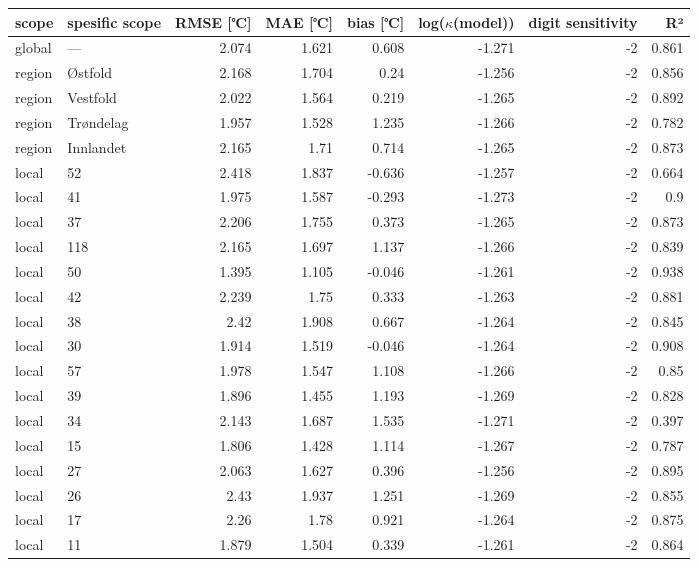 \begin{tabular}{llrrrrrr}
\hline
 scope   & spesific
scope           &       RMSE
[℃] &   MAE [℃] &        bias
[℃] &   log($\kappa$(model)) &    digit
sensitivity &    R² \\
\hline
 global  & ---       & 2.074 &     1.621 &  0.608 &                 -1.271 & -2 & 0.861 \\
 region  & Østfold   & 2.168 &     1.704 &  0.24  &                 -1.256 & -2 & 0.856 \\
 region  & Vestfold  & 2.022 &     1.564 &  0.219 &                 -1.265 & -2 & 0.892 \\
 region  & Trøndelag & 1.957 &     1.528 &  1.235 &                 -1.266 & -2 & 0.782 \\
 region  & Innlandet & 2.165 &     1.71  &  0.714 &                 -1.265 & -2 & 0.873 \\
 local   & 52        & 2.418 &     1.837 & -0.636 &                 -1.257 & -2 & 0.664 \\
 local   & 41        & 1.975 &     1.587 & -0.293 &                 -1.273 & -2 & 0.9   \\
 local   & 37        & 2.206 &     1.755 &  0.373 &                 -1.265 & -2 & 0.873 \\
 local   & 118       & 2.165 &     1.697 &  1.137 &                 -1.266 & -2 & 0.839 \\
 local   & 50        & 1.395 &     1.105 & -0.046 &                 -1.261 & -2 & 0.938 \\
 local   & 42        & 2.239 &     1.75  &  0.333 &                 -1.263 & -2 & 0.881 \\
 local   & 38        & 2.42  &     1.908 &  0.667 &                 -1.264 & -2 & 0.845 \\
 local   & 30        & 1.914 &     1.519 & -0.046 &                 -1.264 & -2 & 0.908 \\
 local   & 57        & 1.978 &     1.547 &  1.108 &                 -1.266 & -2 & 0.85  \\
 local   & 39        & 1.896 &     1.455 &  1.193 &                 -1.269 & -2 & 0.828 \\
 local   & 34        & 2.143 &     1.687 &  1.535 &                 -1.271 & -2 & 0.397 \\
 local   & 15        & 1.806 &     1.428 &  1.114 &                 -1.267 & -2 & 0.787 \\
 local   & 27        & 2.063 &     1.627 &  0.396 &                 -1.256 & -2 & 0.895 \\
 local   & 26        & 2.43  &     1.937 &  1.251 &                 -1.269 & -2 & 0.855 \\
 local   & 17        & 2.26  &     1.78  &  0.921 &                 -1.264 & -2 & 0.875 \\
 local   & 11        & 1.879 &     1.504 &  0.339 &                 -1.261 & -2 & 0.864 \\
\hline
\end{tabular}